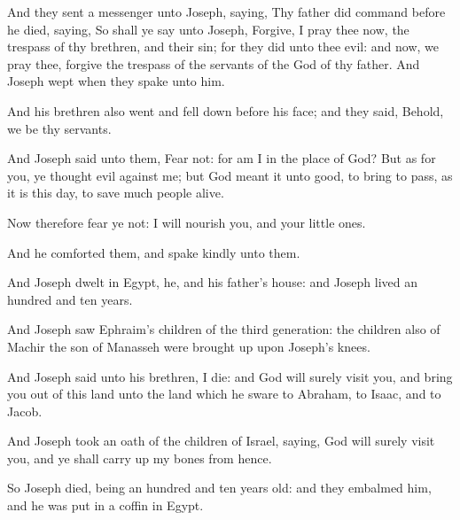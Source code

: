 \Verse And they sent a messenger unto Joseph, saying, Thy father did command before he died, saying, \Verse So shall ye say unto Joseph, Forgive, I pray thee now, the trespass of thy brethren, and their sin; for they did unto thee evil: and now, we pray thee, forgive the trespass of the servants of the God of thy father. And Joseph wept when they spake unto him.

\Verse And his brethren also went and fell down before his face; and they said, Behold, we be thy servants.

\Verse And Joseph said unto them, Fear not: for am I in the place of God?  \Verse But as for you, ye thought evil against me; but God meant it unto good, to bring to pass, as it is this day, to save much people alive.

\Verse Now therefore fear ye not: I will nourish you, and your little ones.

And he comforted them, and spake kindly unto them.

\Verse And Joseph dwelt in Egypt, he, and his father's house: and Joseph lived an hundred and ten years.

\Verse And Joseph saw Ephraim's children of the third generation: the children also of Machir the son of Manasseh were brought up upon Joseph's knees.

\Verse And Joseph said unto his brethren, I die: and God will surely visit you, and bring you out of this land unto the land which he sware to Abraham, to Isaac, and to Jacob.

\Verse And Joseph took an oath of the children of Israel, saying, God will surely visit you, and ye shall carry up my bones from hence.

\Verse So Joseph died, being an hundred and ten years old: and they embalmed him, and he was put in a coffin in Egypt.

